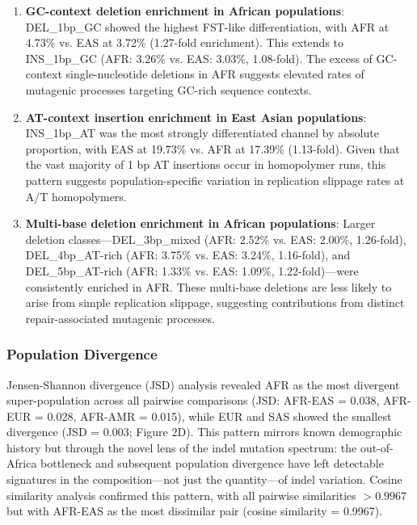 \documentclass[11pt,a4paper]{article}
\begin{document}
\begin{enumerate}
\item \textbf{GC-context deletion enrichment in African populations}: DEL\_1bp\_GC showed the highest FST-like differentiation, with AFR at 4.73\% vs. EAS at 3.72\% (1.27-fold enrichment). This extends to INS\_1bp\_GC (AFR: 3.26\% vs. EAS: 3.03\%, 1.08-fold). The excess of GC-context single-nucleotide deletions in AFR suggests elevated rates of mutagenic processes targeting GC-rich sequence contexts.

\item \textbf{AT-context insertion enrichment in East Asian populations}: INS\_1bp\_AT was the most strongly differentiated channel by absolute proportion, with EAS at 19.73\% vs. AFR at 17.39\% (1.13-fold). Given that the vast majority of 1 bp AT insertions occur in homopolymer runs, this pattern suggests population-specific variation in replication slippage rates at A/T homopolymers.

\item \textbf{Multi-base deletion enrichment in African populations}: Larger deletion classes---DEL\_3bp\_mixed (AFR: 2.52\% vs. EAS: 2.00\%, 1.26-fold), DEL\_4bp\_AT-rich (AFR: 3.75\% vs. EAS: 3.24\%, 1.16-fold), and DEL\_5bp\_AT-rich (AFR: 1.33\% vs. EAS: 1.09\%, 1.22-fold)---were consistently enriched in AFR. These multi-base deletions are less likely to arise from simple replication slippage, suggesting contributions from distinct repair-associated mutagenic processes.
\end{enumerate}

\subsubsection{Population Divergence}

Jensen-Shannon divergence (JSD) analysis revealed AFR as the most divergent super-population across all pairwise comparisons (JSD: AFR-EAS = 0.038, AFR-EUR = 0.028, AFR-AMR = 0.015), while EUR and SAS showed the smallest divergence (JSD = 0.003; Figure 2D). This pattern mirrors known demographic history but through the novel lens of the indel mutation spectrum: the out-of-Africa bottleneck and subsequent population divergence have left detectable signatures in the composition---not just the quantity---of indel variation. Cosine similarity analysis confirmed this pattern, with all pairwise similarities $> 0.9967$ but with AFR-EAS as the most dissimilar pair (cosine similarity = 0.9967).
\end{document}
